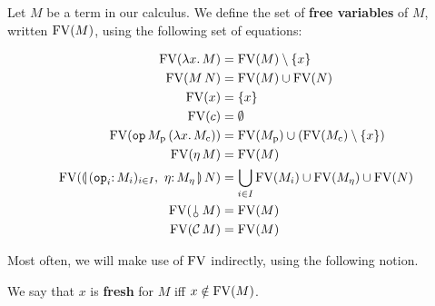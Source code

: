 \begin{definition}
  Let $M$ be a term in our calculus. We define the set of \textbf{free
    variables} of $M$, written $\operatorname{FV}(M)$, using the following set of
  equations:

  \begin{align*}
    \FV(\lam{x}{M}) &= \FV(M) \setminus \{x\} \\
    \FV(\ap{M}{N}) &= \FV(M) \cup \FV(N) \\
    \FV(x) &= \{x\} \\
    \FV(c) &= \emptyset \\
    \FV(\app{\op{op}}{M_\petitp}{(\lam{x}{M_\petitc})})
    &= \FV(M_\petitp) \cup (\FV(M_\petitc) \setminus \{x\}) \\
    \FV(\ap{\eta}{M}) &= \FV(M) \\
    \FV(\ap{\cibanana}{N})
    &= \bigcup_{i \in I} \FV(M_i) \cup \FV(M_\eta) \cup \FV(N) \\
    \FV(\ap{\cherry}{M}) &= \FV(M) \\
    \FV(\ap{\CC}{M}) &= \FV(M)
  \end{align*}
\end{definition}

Most often, we will make use of $\operatorname{FV}$ indirectly, using the following
notion.

\begin{definition}
  We say that $x$ is \textbf{fresh} for $M$ iff $x \notin \operatorname{FV}(M)$.
\end{definition}

